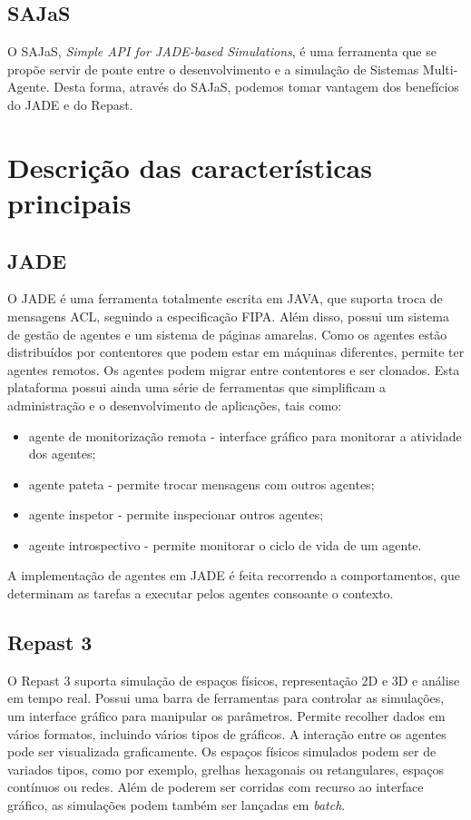 \documentclass[12pt]{report}
\begin{document}
  \subsection{SAJaS}
  O SAJaS, \emph{Simple API for JADE-based Simulations}, é uma ferramenta que se propõe servir de ponte entre o desenvolvimento e a simulação de Sistemas Multi-Agente. Desta forma, através do SAJaS, podemos tomar vantagem dos benefícios do JADE e do Repast.

\section{Descrição das características principais}

  \subsection{JADE}
  O JADE é uma ferramenta totalmente escrita em JAVA, que suporta troca de mensagens ACL, seguindo a especificação FIPA. Além disso, possui um sistema de gestão de agentes e um sistema de páginas amarelas. Como os agentes estão distribuídos por contentores que podem estar em máquinas diferentes, permite ter agentes remotos. Os agentes podem migrar entre contentores e ser clonados. Esta plataforma possui ainda uma série de ferramentas que simplificam a administração e o desenvolvimento de aplicações, tais como:
  \begin{itemize}
   \item agente de monitorização remota - interface gráfico para monitorar a atividade dos agentes;
   \item agente pateta - permite trocar mensagens com outros agentes;
   \item agente inspetor - permite inspecionar outros agentes;
   \item agente introspectivo - permite monitorar o ciclo de vida de um agente.
  \end{itemize}
  A implementação de agentes em JADE é feita recorrendo a comportamentos, que determinam as tarefas a executar pelos agentes consoante o contexto. 
  
  \subsection{Repast 3}
  O Repast 3 suporta simulação de espaços físicos, representação 2D e 3D e análise em tempo real. Possui uma barra de ferramentas para controlar as simulações, um interface gráfico para manipular os parâmetros. Permite recolher dados em vários formatos, incluindo vários tipos de gráficos. A interação entre os agentes pode ser visualizada graficamente. Os espaços físicos simulados podem ser de variados tipos, como por exemplo, grelhas hexagonais ou retangulares, espaços contínuos ou redes. Além de poderem ser corridas com recurso ao interface gráfico, as simulações podem também ser lançadas em \emph{batch}.
  
\end{document}
